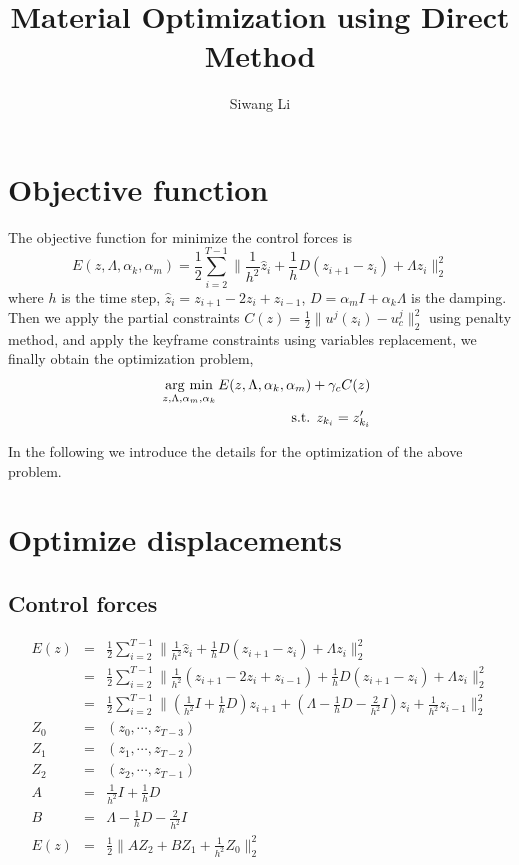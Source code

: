 \documentclass[9pt,twocolumn]{extarticle}
\author{Siwang Li}
\title{Material Optimization using Direct Method}
\newcommand{\argmin}{\operatornamewithlimits{arg\ min}}
\begin{document}
\maketitle

\setlength{\parskip}{0.5ex}

\section{Objective function}
The objective function for minimize the control forces is
\begin{equation} \label{obj} E(z,\Lambda,\alpha_k,\alpha_m) = \frac{1}{2}\sum_{i=2}^{T-1}
  \|\frac{1}{h^2}\hat{z}_i+\frac{1}{h}D(z_{i+1}-z_{i})+ \Lambda z_i\|_2^2
\end{equation}
where $h$ is the time step, $\hat{z}_i=z_{i+1}-2z_{i}+z_{i-1}$,
$D=\alpha_mI+\alpha_k\Lambda$ is the damping. Then we apply the partial
constraints $C(z) = \frac{1}{2}\|u^j(z_i)-u_c^j\|_2^2$ using penalty method, and
apply the keyframe constraints using variables replacement, we finally obtain
the optimization problem,
\begin{eqnarray} \label{sp}
  &&\argmin_{z,\Lambda,\alpha_m,\alpha_k}E(z,\Lambda,\alpha_k,\alpha_m)+\gamma_cC(z)\\
  &&\mbox{s.t. } z_{k_i} = z'_{k_i}
\end{eqnarray}

In the following we introduce the details for the optimization of the above
problem.

\section{Optimize displacements}
\subsection{Control forces}
\begin{eqnarray*}
  E(z) &=& \frac{1}{2}\sum_{i=2}^{T-1}
  \|\frac{1}{h^2}\hat{z}_i+\frac{1}{h}D(z_{i+1}-z_{i})+ \Lambda z_i\|_2^2\\
  &=& \frac{1}{2}\sum_{i=2}^{T-1}
  \|\frac{1}{h^2}(z_{i+1}-2z_{i}+z_{i-1})+\frac{1}{h}D(z_{i+1}-z_{i})+ \Lambda
  z_i\|_2^2\\
  &=& \frac{1}{2}\sum_{i=2}^{T-1}
  \|(\frac{1}{h^2}I+\frac{1}{h}D)z_{i+1}+(\Lambda-\frac{1}{h}D-\frac{2}{h^2}I)z_i
  + \frac{1}{h^2}z_{i-1}\|_2^2\\
  Z_0 &=& (z_0,\cdots,z_{T-3})\\
  Z_1 &=& (z_1,\cdots,z_{T-2})\\
  Z_2 &=& (z_2,\cdots,z_{T-1})\\
  A &=& \frac{1}{h^2}I+\frac{1}{h}D\\
  B &=& \Lambda-\frac{1}{h}D-\frac{2}{h^2}I\\
  E(z) &=& \frac{1}{2}\|AZ_{2}+BZ_1 + \frac{1}{h^2}Z_{0}\|_2^2
\end{eqnarray*}
\end{document}
